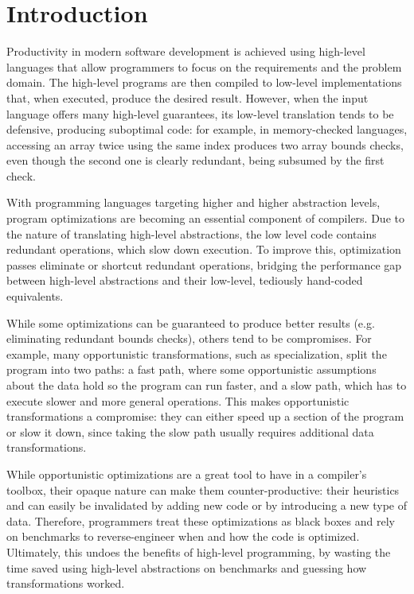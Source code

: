 \section{Introduction}
\label{sec:intro}


Productivity in modern software development is achieved using high-level languages that allow programmers to focus on the requirements and the problem domain. The high-level programs are then compiled to low-level implementations that, when executed, produce the desired result. However, when the input language offers many high-level guarantees, its low-level translation tends to be defensive, producing suboptimal code: for example, in memory-checked languages, accessing an array twice using the same index produces two array bounds checks, even though the second one is clearly redundant, being subsumed by the first check.

With programming languages targeting higher and higher abstraction levels, program optimizations are becoming an essential component of compilers. Due to the nature of translating high-level abstractions, the low level code contains redundant operations, which slow down execution. To improve this, optimization passes eliminate or shortcut redundant operations, bridging the performance gap between high-level abstractions and their low-level, tediously hand-coded equivalents.

While some optimizations can be guaranteed to produce better results (e.g. eliminating redundant bounds checks), others tend to be compromises. For example, many opportunistic transformations, such as specialization, split the program into two paths: a fast path, where some opportunistic assumptions about the data hold so the program can run faster, and a slow path, which has to execute slower and more general operations. This makes opportunistic transformations a compromise: they can either speed up a section of the program or slow it down, since taking the slow path usually requires additional data transformations.

While opportunistic optimizations are a great tool to have in a compiler's toolbox, their opaque nature can make them counter-productive: their heuristics and can easily be invalidated by adding new code or by introducing a new type of data. Therefore, programmers treat these optimizations as black boxes and rely on benchmarks to reverse-engineer when and how the code is optimized. Ultimately, this undoes the benefits of high-level programming, by wasting the time saved using high-level abstractions on benchmarks and guessing how transformations worked.

